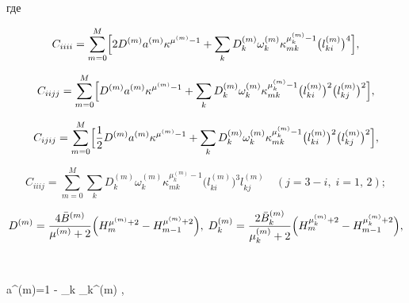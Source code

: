 где

$$

C_{iiii} = \sum\limits_{m = 0}^M \Bigl[ {2D^{(m)}a^{(m)}\kappa ^{\mu 

^{(m)} - 1} + \sum\limits_k {D_k^{(m)} \omega _k^{(m)} } \kappa _{mk}^{\mu 

_k^{(m)} - 1} \bigl( {l_{ki}^{(m)} } \bigr)^4} \Bigr] , 

$$

$$

C_{iijj} =  \sum\limits_{m = 0}^M 

\Bigl[ D^{(m)}a^{(m)}\kappa ^{\mu ^{(m)} - 1} + 

\sum\limits_k {D_k^{(m)} \omega _k^{(m)} } \kappa _{mk}^{\mu _k^{(m)} - 1} 

\bigl( l_{ki}^{(m)}  \bigr)^2\bigl( l_{kj}^{(m)}\bigr)^2 \Bigr], 

$$

$$

C_{ijij} = \sum\limits_{m = 0}^M 

\Bigl[\frac12 D^{(m)}a^{(m)}\kappa ^{\mu ^{(m)} - 1} + 

\sum\limits_k {D_k^{(m)} \omega _k^{(m)} } \kappa _{mk}^{\mu _k^{(m)} - 1} 

\bigl( l_{ki}^{(m)}  \bigr)^2\bigl( l_{kj}^{(m)}\bigr)^2 \Bigr], 

$$

\begin{equation}

\label{nemir:eq15}

C_{iiij} = \sum\limits_{m = 0}^M \sum\limits_k D_k^{(m)} \omega _k^{(m)}  

\kappa _{mk}^{\mu _k^{(m)} - 1} \bigl( l_{ki}^{(m)} \bigr)^3l_{kj}^{(m)}  

\quad(j = 3 - i,\;i = 1,\,2);

\end{equation}

$$

D^{(m)} = \frac{4\bar {B}^{(m)}}{\mu ^{(m)} + 2}\Bigl( {H_m^{\mu ^{(m)} + 

2} - H_{m - 1}^{\mu ^{(m)} + 2} } \Bigr),\; 

D_k^{(m)} = \frac{2\bar {B}_k^{(m)} }{\mu _k^{(m)} + 2}\Bigl( {H_m^{\mu _k^{(m)} + 2} - H_{m - 

1}^{\mu _k^{(m)} + 2} } \Bigr), 

$$

$$

a^{(m)}=1 - \sum\limits_k {\omega _k^{(m)} } , \quad  

